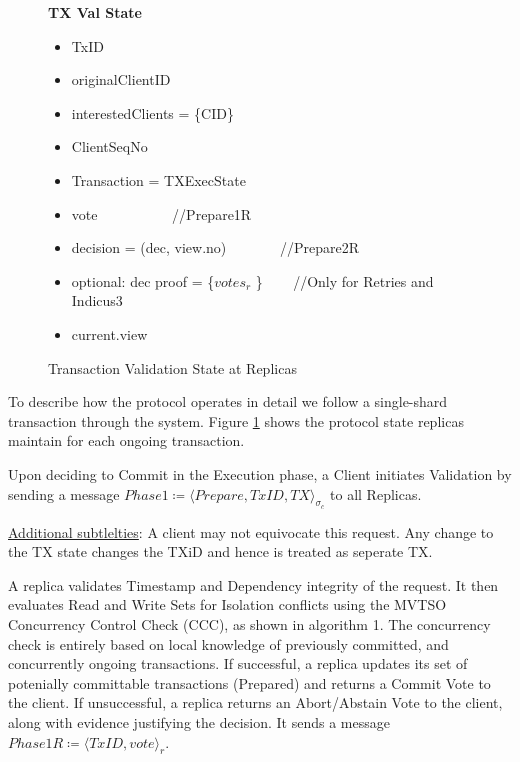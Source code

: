 \begin{figure}[t]
  \begin{mdframed}[roundcorner=10pt]
 	\textbf{TX Val State}
 	\begin{itemize}
 	\item TxID
 	\item originalClientID
 	\item interestedClients = \{CID\}
 	\item ClientSeqNo
 	\item Transaction = TXExecState
 	\item vote   ~~~~~~~~~~//Prepare1R
 	\item decision = (dec, view.no) ~~~~~~~//Prepare2R
 	\item optional: dec proof = \{$votes_r$ \} ~~~ //Only for Retries and Indicus3
 	\item current.view
 	\end{itemize}
  \end{mdframed}
  \caption{Transaction Validation State at Replicas}
  \label{fig:Val}
\end{figure}

To describe how the protocol operates in detail we follow a single-shard transaction through the system. Figure \ref{fig:Val} shows the protocol state replicas maintain for each ongoing transaction.


Upon deciding to Commit in the Execution phase, a Client initiates Validation by sending a message $Phase1 \coloneqq \langle Prepare, TxID, TX \rangle_{\sigma_c}$ to all Replicas.

\underline{Additional subtlelties}: A client may not equivocate this request. Any change to the TX state changes the TXiD and hence is treated as seperate TX. 

A replica validates Timestamp and Dependency integrity of the request. It then evaluates Read and Write Sets for Isolation conflicts using the MVTSO Concurrency Control Check (CCC), as shown in algorithm 1. The concurrency check is entirely based on local knowledge of previously committed, and concurrently ongoing transactions. If successful, a replica updates its set of potenially committable transactions (Prepared) and returns a Commit Vote to the client. If unsuccessful, a replica returns an Abort/Abstain Vote to the client, along with evidence justifying the decision. It sends a message $Phase1R \coloneqq \langle TxID, vote \rangle_r$.



